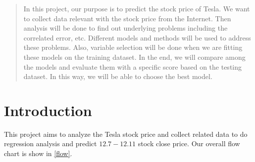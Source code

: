 \documentclass[a0,portrait]{a0poster}
\begin{document}
\begin{multicols}{3} %


\color{Navy} %

\begin{abstract}
In this project, our purpose is to predict the stock price of Tesla. We want to collect data relevant with the stock price from the Internet. Then analysis will be done to find out underlying problems including the correlated error, etc. Different models and methods will be used to address these problems. Also, variable selection will be done when we are fitting these models on the training dataset. In the end, we will compare among the models and evaluate them with a specific score based on the testing dataset. In this way, we will be able to choose the best model.


\end{abstract}

\color{Black} %
\section*{Introduction}
This project aims to analyze the Tesla stock price and collect related data to do regression analysis and predict $12.7-12.11$ stock close price. Our overall flow chart is show in \ref{flow}. 


\end{multicols}
\end{document}
